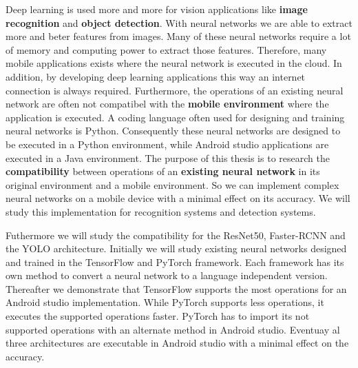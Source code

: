 \newpage
Deep learning is used more and more for vision applications like \textbf{image recognition} and \textbf{object detection}. 
With neural networks we are able to extract more and beter features from images.
Many of these neural networks require a lot of memory and computing power to extract those features.
Therefore, many mobile applications exists where the neural network is executed in the cloud.
In addition, by developing deep learning applications this way an internet connection is always required.
Furthermore, the operations of an existing neural network are often not compatibel with the \textbf{mobile environment} where the application is executed.
A coding language often used for designing and training neural networks is Python.
Consequently these neural networks are designed to be executed in a Python environment, while Android studio applications are executed in a Java environment.
The purpose of this thesis is to research the \textbf{compatibility} between operations of an \textbf{existing neural network} in its original environment and a mobile environment.
So we can implement complex neural networks on a mobile device with a minimal effect on its accuracy.
We will study this implementation for recognition systems and detection systems.

Futhermore we will study the compatibility for the ResNet50, Faster-RCNN and the YOLO architecture.
Initially we will study existing neural networks designed and trained in the TensorFlow and PyTorch framework.
Each framework has its own method to convert a neural network to a language independent version.
Thereafter we demonstrate that TensorFlow supports the most operations for an Android studio implementation.
While PyTorch supports less operations, it executes the supported operations faster.
PyTorch has to import its not supported operations with an alternate method in Android studio.
Eventuay al three architectures are executable in Android studio with a minimal effect on the accuracy.
